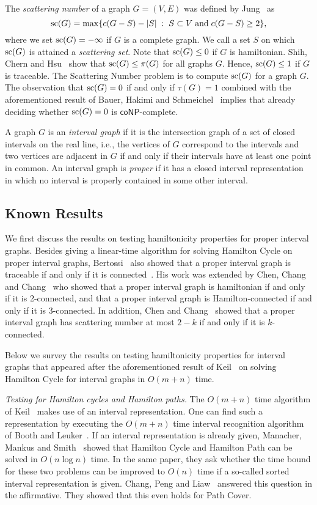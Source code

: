\documentclass{llncs}
\DeclareMathOperator{\scat}{{\rm sc}}
\newcommand{\coNP}{{\mathsf{coNP}}}
\begin{document}
The \emph{scattering number} of a graph $G=(V,E)$ was defined by Jung~\cite{Ju78} as
$$\scat(G)=\max\{c(G-S)-|S| \; :\; S\subset V\; \mbox{and}\;  c(G-S)\geq 2\},$$ 
where we set $\scat(G)=-\infty$ if $G$ is a complete graph.
We call a set $S$ on which $\scat(G)$ is attained a \emph{scattering set}.
Note that $\scat(G)\le 0$ if $G$ is hamiltonian.
Shih, Chern and Hsu~\cite{SCH92} show  that
$\scat(G)\leq \pi(G)$ for all graphs $G$. Hence, $\scat(G)\le 1$ if $G$ is traceable.
The {\sc Scattering Number} problem is to compute $\scat(G)$ for a graph $G$.
The observation that $\scat(G)=0$ if and only if $\tau(G)=1$ combined with the aforementioned result of Bauer, Hakimi and Schmeichel~\cite{BHS90}  implies that already deciding whether 
$\scat(G)=0$ is $\coNP$-complete.

A graph $G$ is an {\it interval graph} if it is the intersection graph of a set of closed intervals on the real line, i.e., the vertices of $G$ correspond to the intervals and two vertices are adjacent in $G$ if and only if their intervals have at least one point in common. An interval graph is {\it proper} if it has a closed interval representation in which no interval is properly contained in some other interval. 

\subsection{Known Results}\label{s-known}

We first discuss the results on testing hamiltonicity properties for proper interval graphs. Besides giving a linear-time algorithm for solving {\sc Hamilton Cycle} on proper interval graphs, Bertossi~\cite{Be83} also showed that a proper interval graph is traceable if and only if it is connected~\cite{Be83}. His work was extended by Chen, Chang and Chang~\cite{CCC97} who showed that
a proper interval graph is hamiltonian if and only if it is 2-connected, and that a proper interval graph is Hamilton-connected if and only if it is 3-connected. 
In addition, Chen and Chang~\cite{CC96} showed that a proper interval graph has scattering number at most $2-k$ if and only if it is $k$-connected.

Below we survey the results on testing hamiltonicity properties for interval graphs that appeared after the aforementioned result of Keil~\cite{Ke85} on solving {\sc Hamilton Cycle} for interval graphs  in $O(m+n)$  time.

\medskip
\noindent
{\it Testing for Hamilton cycles and Hamilton paths.} 
The $O(m+n)$ time algorithm of Keil~\cite{Ke85}
makes use of an interval representation. One can find such a representation by executing the $O(m+n)$ time interval recognition algorithm of 
Booth and Leuker~\cite{BL76}. If an interval representation is already given,
Manacher, Mankus and Smith~\cite{MMS90} showed that {\sc Hamilton Cycle} and {\sc Hamilton Path} can be solved in $O(n\log n)$ time. In the same
paper, they ask whether the time bound for these two problems can be improved to $O(n)$ time if a so-called sorted interval representation is given.
Chang, Peng and Liaw~\cite{CPL99} answered this question in the affirmative. They showed that this even holds for {\sc Path Cover}.
\end{document}
